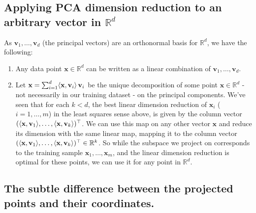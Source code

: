 \documentclass[11pt]{article}
\newcommand{\R}{\ensuremath{\mathbb{R}}}
\newcommand{\V}[1]{\mathbf{#1}}
\begin{document}
\subsection{Applying PCA dimension reduction to an arbitrary vector in $\R^d$}
As $\V{v}_1,\ldots, \V{v}_d$  (the principal vectors) are an orthonormal basis
for $\R^d$, we have the following:
\begin{enumerate}
  \item Any data point $\V{x}\in\R^d$ can be written as a linear 
    combination of  $\V{v}_1,\ldots, \V{v}_d$. 
  \item Let $\V{x}=\sum_{i=1}^d \inner{\V{x},\V{v}_i}\, \V{v}_i$ be the unique decomposition
    of some point
    $\V{x}\in\R^d$ - not necessarily in our training 
    dataset -  on the principal components. 
    We've seen that for each $k<d$, the best linear dimension reduction of
    $\V{x}_i$ ($i=1,\ldots, m$) in the least squares sense above, is 
    given by the column vector $(\inner{\V{x},\V{v}_1},
    \ldots,
  \inner{\V{x},\V{v}_k})^\top$. 
    We can use this map on any other vector $\V{x}$ and reduce its dimension
    with the same linear map, mapping it to 
    the column vector $(\inner{\V{x},\V{v}_1},\ldots,
      \inner{\V{x},\V{v}_k})^\top\in\R^k$.
    So while the subspace we project on corresponds to the training sample 
    $\V{x}_1,\ldots,\V{x}_m$, and the linear dimension reduction is optimal for
    these points, we can use it for any point in $\R^d$. 

\end{enumerate}


\subsection{The subtle difference between the projected points and their
coordinates.}
\end{document}
